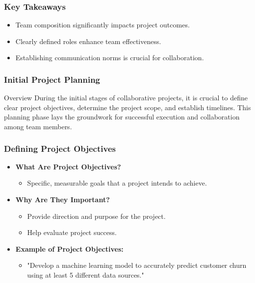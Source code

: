 \documentclass[aspectratio=169]{beamer}
\begin{document}
\begin{frame}[fragile]
    \frametitle{Key Takeaways}
    \begin{itemize}
        \item Team composition significantly impacts project outcomes.
        \item Clearly defined roles enhance team effectiveness.
        \item Establishing communication norms is crucial for collaboration.
    \end{itemize}
\end{frame}

\begin{frame}[fragile]
    \frametitle{Initial Project Planning}
    \begin{block}{Overview}
        During the initial stages of collaborative projects, it is crucial to define clear project objectives, determine the project scope, and establish timelines. This planning phase lays the groundwork for successful execution and collaboration among team members.
    \end{block}
\end{frame}

\begin{frame}[fragile]
    \frametitle{Defining Project Objectives}
    \begin{itemize}
        \item \textbf{What Are Project Objectives?}
        \begin{itemize}
            \item Specific, measurable goals that a project intends to achieve.
        \end{itemize}
        
        \item \textbf{Why Are They Important?}
        \begin{itemize}
            \item Provide direction and purpose for the project.
            \item Help evaluate project success.
        \end{itemize}
        
        \item \textbf{Example of Project Objectives:}
        \begin{itemize}
            \item "Develop a machine learning model to accurately predict customer churn using at least 5 different data sources."
        \end{itemize}
    \end{itemize}
\end{frame}
\end{document}
